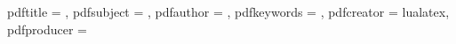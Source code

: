 



\hypersetup
{
    pdftitle    = {},
    pdfsubject  = {},
    pdfauthor   = {},
    pdfkeywords = {} ,
    pdfcreator  = {lualatex},
    pdfproducer = {}
}

\usepackage{blindtext}


    \blinddocument
